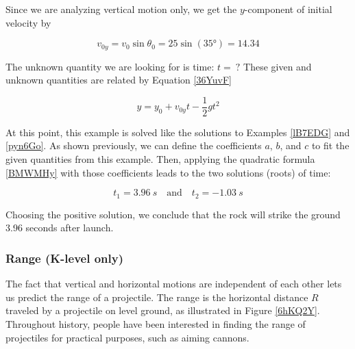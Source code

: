 \documentclass[main-physics.tex]{subfiles}
\begin{document}
\vspace{1em}

Since we are analyzing vertical motion only, we get the $y$-component of initial velocity by

\begin{equation*}
    v_{0y} = v_0 \sin{\theta_0} = 25 \sin{(\ang{35})} = 14.34
\end{equation*}

 The unknown quantity we are looking for is time: $t =\ ?$ These given and unknown quantities are related by Equation \eqref{36YuvF}

\begin{equation*}
    y = y_0 + v_{0y}t - \frac{1}{2} g t^2
\end{equation*}

At this point, this example is solved like the solutions to Examples \ref{lB7EDG} and \ref{pyn6Go}. As shown previously, we can define the coefficients $a$, $b$, and $c$ to fit the given quantities from this example. Then, applying the quadratic formula \eqref{BMWMHy} with those coefficients leads to the two solutions (roots) of time:

\begin{equation*}
    t_1 = \SI{3.96}{s} \quad \text{and} \quad t_2 = \SI{-1.03}{s}
\end{equation*}

Choosing the positive solution, we conclude that the rock will strike the ground 3.96 seconds after launch.

\subsubsection*{Range (K-level only)}

The fact that vertical and horizontal motions are independent of each other lets us predict the range of a projectile. The \gls{range} is the horizontal distance $R$ traveled by a projectile on level ground, as illustrated in Figure \ref{6hKQ2Y}. Throughout history, people have been interested in finding the range of projectiles for practical purposes, such as aiming cannons.
\end{document}
